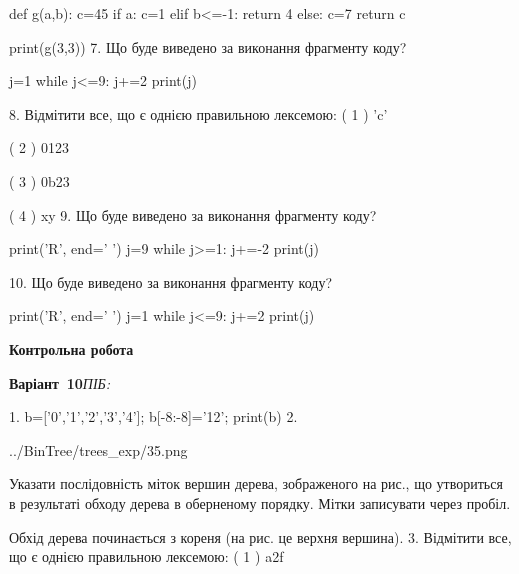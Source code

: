 \documentclass[11pt]{article}
\begin{document}
def g(a,b):
    c=45
    if a:
        c=1
    elif b<=-1:
         return 4
    else: 
        c=7
    return c

print(g(3,3))
\vspace{5mm}
7. Що буде виведено за виконання фрагменту коду?

j=1
while j<=9:
    j+=2
print(j)

\vspace{5mm}
8. %
Відмітити все, що є однією правильною лексемою:
( 1 ) 'c'

( 2 ) 0123

( 3 ) 0b23

( 4 ) xy
\vspace{5mm}
9. Що буде виведено за виконання фрагменту коду?

print('R', end=' ')
j=9
while j>=1:
    j+=-2
print(j)

\vspace{5mm}
10. Що буде виведено за виконання фрагменту коду?

print('R', end=' ')
j=1
while j<=9:
    j+=2
print(j)

\vspace{5mm}










\newpage

\newpage

{\large\textbf{Контрольна робота}}

\textbf{Варіант \No\,10}\hfill \textit{ПІБ:}\,\underline{\hspace{60mm}}
\vspace{4mm}

1. 
b=['0','1','2','3','4']; b[-8:-8]='12'; print(b)\vspace{5mm}
2. 

\begin{center}
	{../BinTree/trees_exp/35.png}
\end{center}
Указати послідовність міток вершин дерева, зображеного на рис., що утвориться в результаті обходу дерева в оберненому порядку. Мітки записувати через пробіл.\par Обхід дерева починається з кореня (на рис. це верхня вершина).
\vspace{5mm}
3. %
Відмітити все, що є однією правильною лексемою:
( 1 ) a2f
\end{document}
